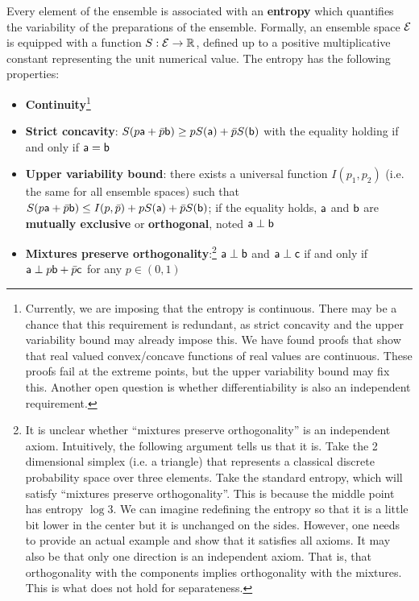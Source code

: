 \begin{mathSection}
\begin{axiom}
	Every element of the ensemble is associated with an \textbf{entropy} which quantifies the variability of the preparations of the ensemble. Formally, an ensemble space $\Ens$ is equipped with a function $S : \Ens \to \mathbb{R}$, defined up to a positive multiplicative constant representing the unit numerical value. The entropy has the following properties:
	\begin{itemize}
		\item \textbf{Continuity}\footnote{Currently, we are imposing that the entropy is continuous. There may be a chance that this requirement is redundant, as strict concavity and the upper variability bound may already impose this. We have found proofs that show that real valued convex/concave functions of real values are continuous. These proofs fail at the extreme points, but the upper variability bound may fix this. Another open question is whether differentiability is also an independent requirement.}
		\item \textbf{Strict concavity}: $S(p\ens[a] + \bar{p} \ens[b]) \geq p S(\ens[a]) + \bar{p} S(\ens[b])$ with the equality holding if and only if $\ens[a] = \ens[b]$
		\item \textbf{Upper variability bound}: there exists a universal function $I(p_1, p_2)$ (i.e. the same for all ensemble spaces) such that $S(p\ens[a] + \bar{p} \ens[b]) \leq I(p, \bar{p}) + p S(\ens[a]) + \bar{p} S(\ens[b])$; if the equality holds, $\ens[a]$ and $\ens[b]$ are \textbf{mutually exclusive} or \textbf{orthogonal}, noted $\ens[a] \ortho \ens[b]$
		\item \textbf{Mixtures preserve orthogonality}:\footnote{It is unclear whether ``mixtures preserve orthogonality'' is an independent axiom. Intuitively, the following argument tells us that it is. Take the 2 dimensional simplex (i.e. a triangle) that represents a classical discrete probability space over three elements. Take the standard entropy, which will satisfy ``mixtures preserve orthogonality''. This is because the middle point has entropy $\log 3$. We can imagine redefining the entropy so that it is a little bit lower in the center but it is unchanged on the sides. However, one needs to provide an actual example and show that it satisfies all axioms. It may also be that only one direction is an independent axiom. That is, that orthogonality with the components implies orthogonality with the mixtures. This is what does not hold for separateness.} $\ens[a] \ortho \ens[b]$ and $\ens[a] \ortho \ens[c]$ if and only if $\ens[a] \ortho p \ens[b] + \bar{p} \ens[c]$ for any $p \in (0,1)$
	\end{itemize}
\end{axiom}


\end{mathSection}
